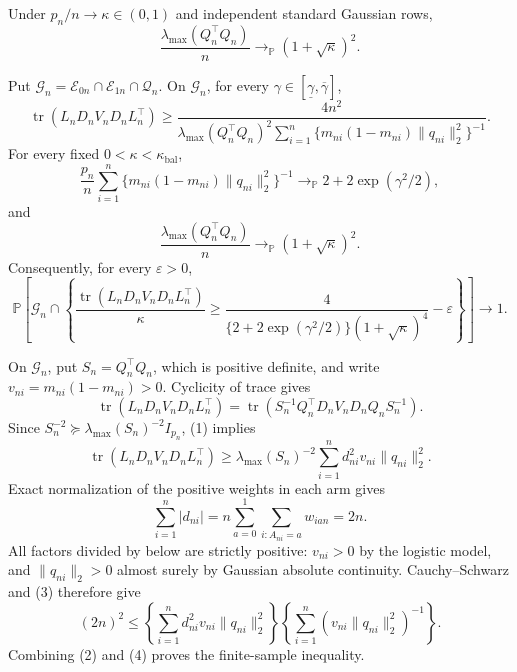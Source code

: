 Under \(p_n/n\to\kappa\in(0,1)\) and independent standard Gaussian rows,
\[
 \frac{\lambda_{\max}(Q_n^\top Q_n)}n
 \longrightarrow_{\mathbb P}(1+\sqrt\kappa)^2.
\]

Put \(\mathcal G_n=\mathcal E_{0n}\cap\mathcal E_{1n}\cap\mathcal Q_n\).  On \(\mathcal G_n\), for every \(\gamma\in[\underline\gamma,\overline\gamma]\),
\[
 \operatorname{tr}(L_nD_nV_nD_nL_n^\top)
 \ge
 \frac{4n^2}
 {\lambda_{\max}(Q_n^\top Q_n)^2
  \displaystyle\sum_{i=1}^n
  \{m_{ni}(1-m_{ni})\|q_{ni}\|_2^2\}^{-1}}.
\]
For every fixed \(0<\kappa<\kappa_{\mathrm{bal}}\),
\[
 \frac{p_n}{n}\sum_{i=1}^n
 \{m_{ni}(1-m_{ni})\|q_{ni}\|_2^2\}^{-1}
 \longrightarrow_{\mathbb P}2+2\exp(\gamma^2/2),
\]
and
\[
 \frac{\lambda_{\max}(Q_n^\top Q_n)}n
 \longrightarrow_{\mathbb P}(1+\sqrt\kappa)^2.
\]
Consequently, for every \(\varepsilon>0\),
\[
 \mathbb P\!\left[
 \mathcal G_n\cap
 \left\{
 \frac{\operatorname{tr}(L_nD_nV_nD_nL_n^\top)}\kappa
 \ge
 \frac4{\{2+2\exp(\gamma^2/2)\}(1+\sqrt\kappa)^4}-\varepsilon
 \right\}
 \right]\longrightarrow1.
\]

On \(\mathcal G_n\), put \(S_n=Q_n^\top Q_n\), which is positive definite, and write \(v_{ni}=m_{ni}(1-m_{ni})>0\).  Cyclicity of trace gives
\[
 \operatorname{tr}(L_nD_nV_nD_nL_n^\top)
 =\operatorname{tr}\!\left(
 S_n^{-1}Q_n^\top D_nV_nD_nQ_nS_n^{-1}\right).
 \tag{1}
\]
Since \(S_n^{-2}\succeq\lambda_{\max}(S_n)^{-2}I_{p_n}\), (1) implies
\[
 \operatorname{tr}(L_nD_nV_nD_nL_n^\top)
 \ge \lambda_{\max}(S_n)^{-2}
 \sum_{i=1}^nd_{ni}^2v_{ni}\|q_{ni}\|_2^2.
 \tag{2}
\]
Exact normalization of the positive weights in each arm gives
\[
 \sum_{i=1}^n|d_{ni}|
 =n\sum_{a=0}^1\sum_{i:A_{ni}=a}w_{ian}=2n.
 \tag{3}
\]
All factors divided by below are strictly positive: \(v_{ni}>0\) by the logistic model, and \(\|q_{ni}\|_2>0\) almost surely by Gaussian absolute continuity.  Cauchy--Schwarz and (3) therefore give
\[
 (2n)^2
 \le
 \left\{\sum_{i=1}^nd_{ni}^2v_{ni}\|q_{ni}\|_2^2\right\}
 \left\{\sum_{i=1}^n(v_{ni}\|q_{ni}\|_2^2)^{-1}\right\}.
 \tag{4}
\]
Combining (2) and (4) proves the finite-sample inequality.

